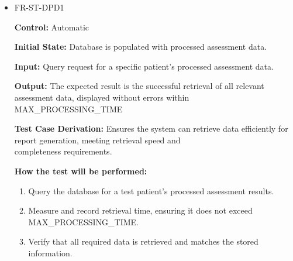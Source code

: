 \documentclass[12pt, titlepage]{article}
\begin{document}
\begin{itemize}
  \item FR-ST-DPD1
  \begin{mdframed}[linewidth=0.5mm]
      \textbf{Control:} Automatic \par
      \textbf{Initial State:} Database is populated with processed assessment data. \par
      \textbf{Input:} Query request for a specific patient’s processed assessment data. \par
      \textbf{Output:} The expected result is the successful retrieval of all relevant assessment data, displayed without errors within \\MAX\_PROCESSING\_TIME \par
      \textbf{Test Case Derivation:} Ensures the system can retrieve data efficiently for report generation, meeting retrieval speed and \\completeness requirements. \par
      \textbf{How the test will be performed:}
      \begin{enumerate}[noitemsep]
        \item Query the database for a test patient’s processed assessment results. 
        \item Measure and record retrieval time, ensuring it does not exceed\\
        MAX\_PROCESSING\_TIME. 
        \item Verify that all required data is retrieved and matches the stored information.
      \end{enumerate}
  \end{mdframed}


\end{itemize}
\end{document}
